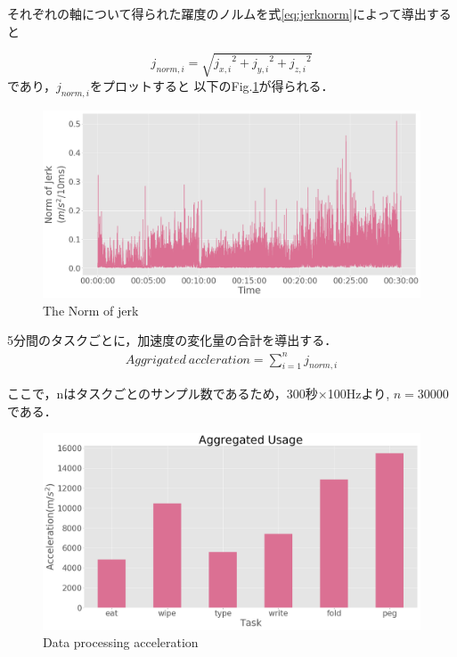 それぞれの軸について得られた躍度のノルムを式\ref{eq:jerknorm}によって導出すると

\begin{equation}
j_{norm,i} = \sqrt{{j_{x,i}}^2+{j_{y,i}}^2+{j_{z,i}}^2}
\label{eq:jerknorm}
\end{equation}
であり，$j_{norm,i}$をプロットすると
以下のFig.\ref{fig:norm_jerk}が得られる．

\begin{figure}[H]
  \centering
  \includegraphics[width=0.8\linewidth]{fig/norm_jerk}
  \caption{The Norm of jerk}
  \label{fig:norm_jerk}
\end{figure}

5分間のタスクごとに，加速度の変化量の合計を導出する．
\begin{eqnarray}
Aggrigated\ accleration  = \sum_{i=1}^n j_{norm,i}
\end{eqnarray}

ここで，nはタスクごとのサンプル数であるため，300秒$\times$100Hzより,
$n=30000$である．

\begin{figure}[H]
  \centering
  \includegraphics[width=0.8\linewidth]{fig/aggrigated_accel}
  \caption{Data processing acceleration}
  \label{fig:accel_xyz}
\end{figure}


